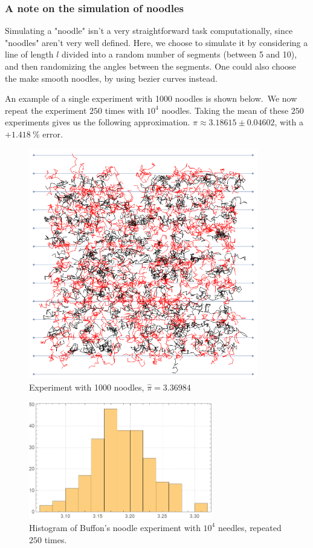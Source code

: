 \documentclass[12pt]{article}
\numberwithin{equation}{section}
\begin{document}
\subsubsection{A note on the simulation of noodles}
Simulating a "noodle" isn't a very straightforward task computationally, since "noodles" aren't very well defined. Here, we choose to simulate it by considering a line of length $l$ divided into a random number of segments (between 5 and 10), and then randomizing the angles between the segments. One could also choose the make smooth noodles, by using bezier curves instead.
\par 
An example of a single experiment with 1000 noodles is shown  below.\
We now repeat the experiment $250$ times with $10^4$ noodles. Taking the mean of these $250$ experiments gives us the following approximation. $\pi \approx 3.18615 \pm 0.04602$, with a $ + 1.418\ \%$ error.
\begin{figure}[!htb]
    \centering
    \includegraphics[width=10cm]{Images/noodleexample.png}
    \caption{Experiment with 1000 noodles, $\widehat{\pi}=3.36984$}
    \label{fig:noodleexample}
\end{figure}\par

\begin{figure}[!htb]
    \centering
    \includegraphics[width=8cm]{Images/repeatednoodle.png}
    \caption{Histogram of Buffon's noodle experiment with $10^4$ needles, repeated $250$ times.}
    \label{fig:repeatednoodle}
\end{figure}
\clearpage
\end{document}
